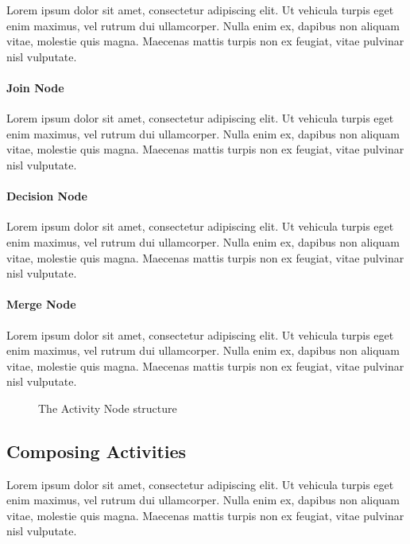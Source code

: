 Lorem ipsum dolor sit amet, consectetur adipiscing elit. Ut vehicula turpis eget enim maximus, vel rutrum dui ullamcorper. Nulla enim ex, dapibus non aliquam vitae, molestie quis magna. Maecenas mattis turpis non ex feugiat, vitae pulvinar nisl vulputate.

\paragraph{Join Node}

Lorem ipsum dolor sit amet, consectetur adipiscing elit. Ut vehicula turpis eget enim maximus, vel rutrum dui ullamcorper. Nulla enim ex, dapibus non aliquam vitae, molestie quis magna. Maecenas mattis turpis non ex feugiat, vitae pulvinar nisl vulputate.

\paragraph{Decision Node}

Lorem ipsum dolor sit amet, consectetur adipiscing elit. Ut vehicula turpis eget enim maximus, vel rutrum dui ullamcorper. Nulla enim ex, dapibus non aliquam vitae, molestie quis magna. Maecenas mattis turpis non ex feugiat, vitae pulvinar nisl vulputate.

\paragraph{Merge Node}

Lorem ipsum dolor sit amet, consectetur adipiscing elit. Ut vehicula turpis eget enim maximus, vel rutrum dui ullamcorper. Nulla enim ex, dapibus non aliquam vitae, molestie quis magna. Maecenas mattis turpis non ex feugiat, vitae pulvinar nisl vulputate.

\begin{figure}[!ht]
	\centering
	
	\caption{The Activity Node structure}
	\label{fig:activity_nodes}
\end{figure}

\subsection{Composing Activities}

Lorem ipsum dolor sit amet, consectetur adipiscing elit. Ut vehicula turpis eget enim maximus, vel rutrum dui ullamcorper. Nulla enim ex, dapibus non aliquam vitae, molestie quis magna. Maecenas mattis turpis non ex feugiat, vitae pulvinar nisl vulputate.

